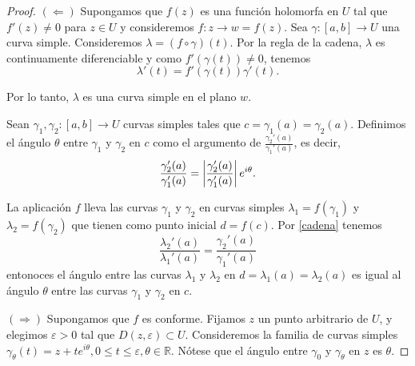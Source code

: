 \begin{proof}
    $(\Leftarrow)$ Supongamos que $f(z)$ es una función holomorfa en $U$ tal que $f'(z) \not = 0$ para $z \in U$ y consideremos $f:z \rightarrow w=f(z)$. Sea $\gamma: [a,b] \rightarrow U$ una curva simple. Consideremos $\lambda = (f \circ  \gamma)(t)$. Por la regla de la cadena, $\lambda$ es continuamente diferenciable y como $f'(\gamma(t)) \not = 0$, tenemos
    \begin{equation}
        \label{cadena}
        \lambda'(t) = f'(\gamma(t))\gamma'(t).
    \end{equation}

    Por lo tanto, $\lambda$ es una curva simple en el plano $w$.

    Sean $\gamma_1, \gamma_2: [a,b] \rightarrow U$ curvas simples tales que $c=\gamma_1(a) = \gamma_2(a)$. Definimos el ángulo $\theta$ entre $\gamma_1$ y $\gamma_2$ en $c$ como el argumento de $\frac{\gamma_2'(a)}{\gamma_1'(a)}$, es decir,
    \begin{equation*}
        \dfrac{\gamma_2'(a)}{\gamma_1'(a)} = \left\lvert\dfrac{\gamma_2'(a)}{\gamma_1'(a)}\right\rvert e^{i\theta}.
    \end{equation*}

    La aplicación $f$ lleva las curvas $\gamma_1$ y $\gamma_2$ en curvas simples $\lambda_1=f(\gamma_1)$ y $\lambda_2=f(\gamma_2)$ que tienen como punto inicial $d=f(c)$. Por \ref{cadena} tenemos
    \begin{equation*}
        \dfrac{\lambda_2'(a)}{\lambda_1'(a)} = \dfrac{\gamma_2'(a)}{\gamma_1'(a)}
    \end{equation*}
    entonoces el ángulo entre las curvas $\lambda_1$ y $\lambda_2$ en $d = \lambda_1(a) = \lambda_2(a)$ es igual al ángulo $\theta$ entre las curvas $\gamma_1$ y $\gamma_2$ en $c$. \\ \par

    $(\Rightarrow)$ Supongamos que $f$ es conforme. Fijamos $z$ un punto arbitrario de $U$, y elegimos $\varepsilon > 0$ tal que $D(z, \varepsilon) \subset U$. Consideremos la familia de curvas simples $\gamma_{\theta}(t) = z + te^{i \theta}, 0 \leq t \leq \varepsilon, \theta \in \mathbb{R}$. Nótese que el ángulo entre $\gamma_0$ y $\gamma_{\theta}$ en $z$ es $\theta$.



\end{proof}
